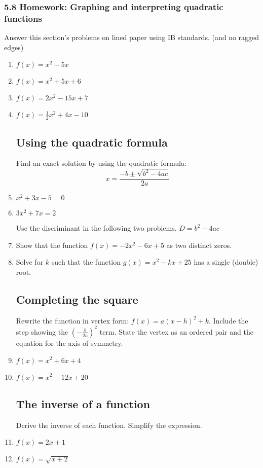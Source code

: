 \documentclass[12pt, twoside]{article}
\begin{document}
    \subsubsection*{5.8 Homework: Graphing and interpreting quadratic functions}
    Answer this section's problems on lined paper using IB standards. (and no ragged edges)
    
    
    \begin{enumerate}
    
    \item   $f(x)=x^2-5x$
    \item   $f(x)=x^2+5x+6$
    \item   $f(x)=2x^2-15x+7$
    \item   $f(x)=\frac{1}{2}x^2+4x-10$
    
    \subsection*{Using the quadratic formula}
    
    Find an exact solution by using the quadratic formula: 
    \[x=\frac{-b \pm \sqrt{b^2-4ac}}{2a}\]
    \item   $x^2+3x-5=0$
    \item   $3x^2+7x = 2$
    
    Use the discriminant in the following two problems. $D=b^2-4ac$ 
    \item Show that the function $f(x)=-2x^2-6x+5$ as two distinct zeros.
    \item Solve for $k$ such that the function $g(x)=x^2-kx+25$ has a single (double) root.
    
    \subsection*{Completing the square}
    
    Rewrite the function in vertex form: $f(x)=a(x-h)^2+k$. Include the step showing the $(-\frac{b}{2a})^2$ term. State the vertex as an ordered pair and the equation for the axis of symmetry.
    \item   $f(x)=x^2+6x+4$
    \item   $f(x)=x^2-12x+20$
    
    \subsection*{The inverse of a function}
    Derive the inverse of each function. Simplify the expression.
    \item   $f(x)=2x+1$
    \item   $f(x)=\sqrt{x+2}$
    

\end{enumerate}
\end{document}
